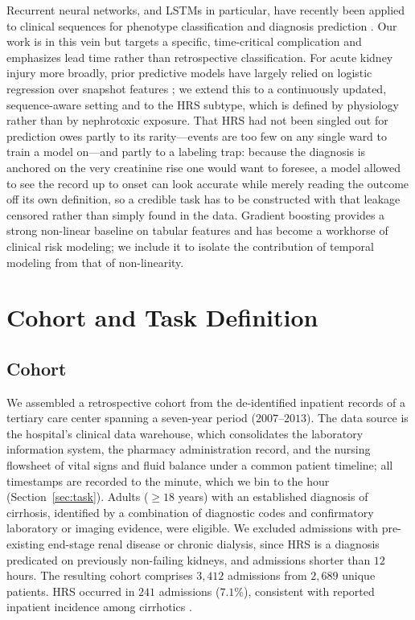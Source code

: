 \documentclass{article}
\begin{document}
Recurrent neural networks, and LSTMs in particular, have recently been applied to
clinical sequences for phenotype classification and diagnosis prediction
\citep{Lipton2015,Lasko2013}. Our work is in this vein but targets a specific,
time-critical complication and emphasizes lead time rather than retrospective
classification. For acute kidney injury more broadly, prior predictive models have
largely relied on logistic regression over snapshot features \citep{Matheny2010}; we
extend this to a continuously updated, sequence-aware setting and to the HRS
subtype, which is defined by physiology rather than by nephrotoxic exposure. That HRS
had not been singled out for prediction owes partly to its rarity---events are too few
on any single ward to train a model on---and partly to a labeling trap: because the
diagnosis is anchored on the very creatinine rise one would want to foresee, a model
allowed to see the record up to onset can look accurate while merely reading the
outcome off its own definition, so a credible task has to be constructed with that
leakage censored rather than simply found in the data.
Gradient boosting \citep{Friedman2001} provides a strong non-linear baseline on
tabular features and has become a workhorse of clinical risk modeling; we include
it to isolate the contribution of temporal modeling from that of non-linearity.

\section{Cohort and Task Definition}

\subsection{Cohort}

We assembled a retrospective cohort from the de-identified inpatient records of a
tertiary care center spanning a seven-year period ($2007$--$2013$). The data source
is the hospital's clinical data warehouse, which consolidates the laboratory
information system, the pharmacy administration record, and the nursing flowsheet of
vital signs and fluid balance under a common patient timeline; all timestamps are
recorded to the minute, which we bin to the hour (Section~\ref{sec:task}). Adults
($\geq 18$ years) with an established diagnosis of cirrhosis, identified by a
combination of diagnostic codes and confirmatory laboratory or imaging evidence, were
eligible. We excluded admissions with pre-existing end-stage renal disease or chronic
dialysis, since HRS is a diagnosis predicated on previously non-failing kidneys, and
admissions shorter than $12$ hours. The resulting cohort comprises $3{,}412$
admissions from $2{,}689$ unique patients. HRS occurred in $241$ admissions
($7.1\%$), consistent with reported inpatient incidence among cirrhotics
\citep{Salerno2007}.
\end{document}
